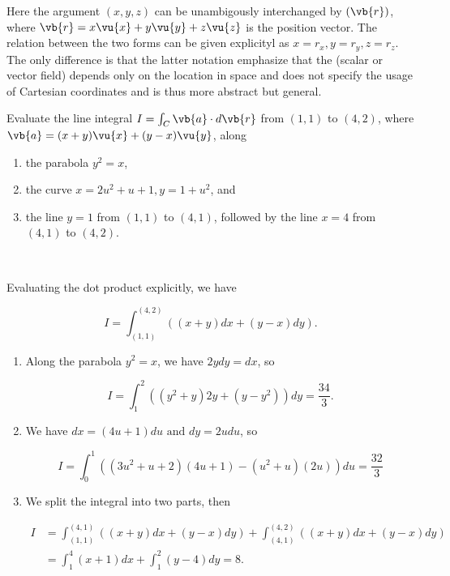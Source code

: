 \documentclass[english,a4paper,12pt]{report}
\begin{document}
Here the argument \((x,y,z)\) can be unambigously interchanged by \((\vb{r} )\), where \(\vb{r} = x \vu{x} + y \vu{y} + z \vu{z} \) is the position vector. The relation between the two forms can be given explicityl as \(x = r_{x}, y = r_{y}, z = r_{z}\). The only difference is that the latter notation emphasize that the (scalar or vector field) depends only on the location in space and does not specify the usage of Cartesian coordinates and is thus more abstract but general.   

{Evaluate the line integral \(I = \int_{C}^{} \vb{a} \cdot d\vb{r}  \) from \((1,1)\) to \((4,2)\), where \(\vb{a}  = (x+y)\vu{x} + (y-x)\vu{y} \), along 
\begin{enumerate}[itemsep=10pt]
	\item the parabola \(y^2 = x\),
	\item the curve \(x = 2u^2+u+1, y= 1+u^2\), and
	\item the line \(y=1\) from \((1,1)\) to \((4,1)\), followed by the line \(x = 4\) from \((4,1)\) to \((4,2)\).      
\end{enumerate}~
}
{Evaluating the dot product explicitly, we have 

\begin{equation}
	 I = \int_{(1,1)}^{(4,2)} ((x+y)dx + (y-x)dy).
\end{equation}

\begin{enumerate}
	\item Along the parabola \(y^2 = x\), we have \(2ydy = dx\), so 
	
	\begin{equation}
		I = \int_{1}^{2} ((y^2+y)2y + (y - y^2))dy = \frac{34}{3}.    
	\end{equation}
	
	\item We have \(dx = (4u+1)du \text { and } dy = 2udu\), so
	
	\begin{equation}
		I = \int_{0}^{1} ((3u^2+u+2)(4u+1)-(u^2+u)(2u))du = \frac{32}{3}  
	\end{equation}
	
	\item We split the integral into two parts, then 
	
	\begin{equation}
	\begin{aligned} 
		I &= \int_{(1,1)}^{(4,1)} ((x+y)dx + (y-x)dy) + \int_{(4,1)}^{(4,2)} ((x+y)dx + (y-x)dy) \\ &= \int_{1}^{4} (x+1)dx + \int_{1}^{2} (y-4)dy = 8.      
	\end{aligned} 
    \end{equation}
\end{enumerate}~
} 
\end{document}
